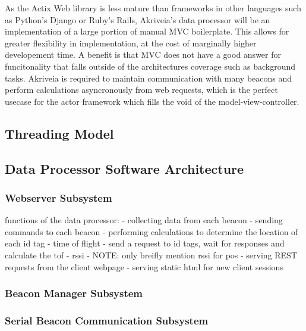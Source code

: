 \bigskip
As the Actix Web library is less mature than frameworks in other languages such as Python's Django or Ruby's Rails, Akriveia's data processor will be an implementation of a large portion of manual MVC boilerplate.
This allows for greater flexibility in implementation, at the cost of marginally higher developement time.
A benefit is that MVC does not have a good answer for funcitonality that falls outside of the architectures coverage such as background tasks.
Akriveia is required to maintain communication with many beacons and perform calculations asyncronously from web requests, which is the perfect usecase for the actor framework which fills the void of the model-view-controller.


\bigskip
\subsection{Threading Model}

\bigskip
\subsection{Data Processor Software Architecture}

\bigskip
\subsubsection{Webserver Subsystem}
functions of the data processor:
	- collecting data from each beacon
	- sending commands to each beacon
	- performing calculations to determine the location of each id tag
		- time of flight
			- send a request to id tags, wait for responses and calculate the tof
		- rssi
			- NOTE: only breifly mention rssi for pos
	- serving REST requests from the client webpage
	- serving static html for new client sessions

\bigskip
\subsubsection{Beacon Manager Subsystem}

\bigskip
\subsubsection{Serial Beacon Communication Subsystem}

